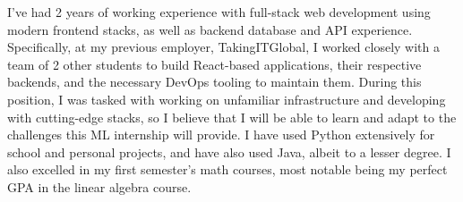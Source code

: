 \documentclass[11pt, letter]{awesome-cv}
\begin{document}
\begin{cvletter}
I've had 2 years of working experience with full-stack web development
using modern frontend stacks, as well as backend database and API experience.
Specifically, at my previous employer, TakingITGlobal,
I worked closely with a team of 2 other students to build React-based applications,
their respective backends, and the necessary DevOps tooling to maintain them.
During this position, I was tasked with working on unfamiliar infrastructure and developing with cutting-edge stacks,
so I believe that I will be able to learn and adapt to the challenges this ML internship will provide.
I have used Python extensively for school and personal projects, and have also used Java, albeit to a lesser degree.
I also excelled in my first semester's math courses, most notable being my perfect GPA in the linear algebra course.


\end{cvletter}
\end{document}

